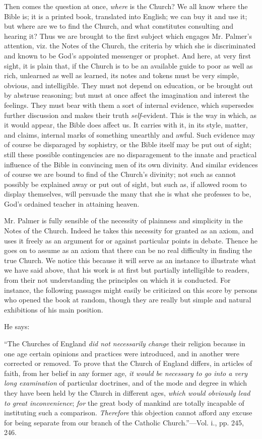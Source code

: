 Then comes the question at once, \emph{where} is
the Church? We all know where the Bible is; it is a printed book,
translated into English; we can buy it and use it; but where are we to
find the Church, and what constitutes consulting and hearing it? Thus
we are brought to the first subject which engages Mr. Palmer's
attention, viz. the Notes of the Church, the criteria by which
she is discriminated and known to be God's appointed messenger or
prophet. And here, at very first sight, it is plain that, if the
Church is to be an available guide to poor as well as rich, unlearned
as well as learned, its notes and tokens must be very simple, obvious,
and intelligible. They must not depend on education, or be brought out
by abstruse reasoning; but must at once affect the imagination and
interest the feelings. They must bear with them a sort of internal
evidence, which supersedes further discussion and makes their truth \emph{self}-evident.
This is the way in which, as it would appear, the Bible does affect
us. It carries with it, in its style, matter, and claims, internal
marks of something unearthly and awful. Such evidence may of course be
disparaged by sophistry, or the Bible itself may be put out of sight;
still these possible contingencies are no disparagement to the innate
and practical influence of the Bible in convincing men of its own
divinity. And similar evidences of course we are bound to find of the
Church's divinity; not such as cannot possibly be explained away or
put out of sight, but such as, if allowed room to display themselves,
will persuade the many that she is what she professes to be, God's
ordained teacher in attaining heaven.

Mr. Palmer is fully sensible of the necessity of
plainness and simplicity in the Notes of the Church. Indeed he takes
this necessity for granted as an axiom, and uses it freely as an
argument for or against particular points in debate. Thence he goes on
to assume as an axiom that there can be no real difficulty in finding
the true Church. We notice this because it will serve as an instance
to illustrate what we have said above, that his work is at first but
partially intelligible to readers, from their not understanding
the principles on which it is conducted. For instance, the following
passages might easily be criticized on this score by persons who
opened the book at random, though they are really but simple and
natural exhibitions of his main position.

He says:

``The
Churches of England \emph{did not necessarily change} their religion
because in one age certain opinions and practices were introduced, and
in another were corrected or removed. To prove that the Church of
England differs, in articles of faith, from her belief in any former
age, \emph{it would be necessary to go into a very long examination}
of particular doctrines, and of the mode and degree in which they have
been held by the Church in different ages, \emph{which would obviously
lead to great inconvenience}; \emph{for} the great body of mankind
are totally incapable of instituting such a comparison. \emph{Therefore}
this objection cannot afford any excuse for being separate from our
branch of the Catholic Church.''—Vol. i., pp. 245, 246.

